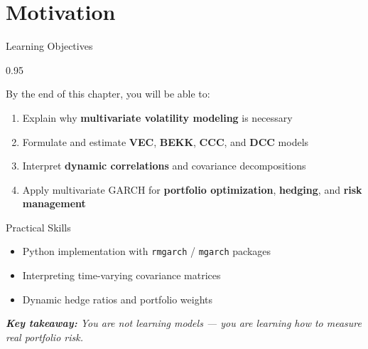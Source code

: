 \documentclass[9pt, aspectratio=169, t]{beamer}
\subtitle{Chapter 5b: Multivariate GARCH Models}
\begin{document}
{
\begin{frame}
    \titlepage
\end{frame}
}

\section{Motivation}

\begin{frame}{Learning Objectives}
    \begin{cminipage}{0.95\textwidth}
    {\footnotesize
    \begin{block}{By the end of this chapter, you will be able to:}
        \begin{enumerate}\setlength{\itemsep}{2pt}
            \item Explain why \textbf{multivariate volatility modeling} is necessary
            \item Formulate and estimate \textbf{VEC}, \textbf{BEKK}, \textbf{CCC}, and \textbf{DCC} models
            \item Interpret \textbf{dynamic correlations} and covariance decompositions
            \item Apply multivariate GARCH for \textbf{portfolio optimization}, \textbf{hedging}, and \textbf{risk management}
        \end{enumerate}
    \end{block}
    \vspace{0.1cm}
    \begin{alertblock}{Practical Skills}
        \begin{itemize}\setlength{\itemsep}{0pt}
            \item Python implementation with \texttt{rmgarch} / \texttt{mgarch} packages
            \item Interpreting time-varying covariance matrices
            \item Dynamic hedge ratios and portfolio weights
        \end{itemize}
    \end{alertblock}
    \vspace{0.2cm}
    \textit{\textbf{Key takeaway:} You are not learning models --- you are learning how to measure real portfolio risk.}
    }
    \end{cminipage}
\end{frame}
\end{document}
